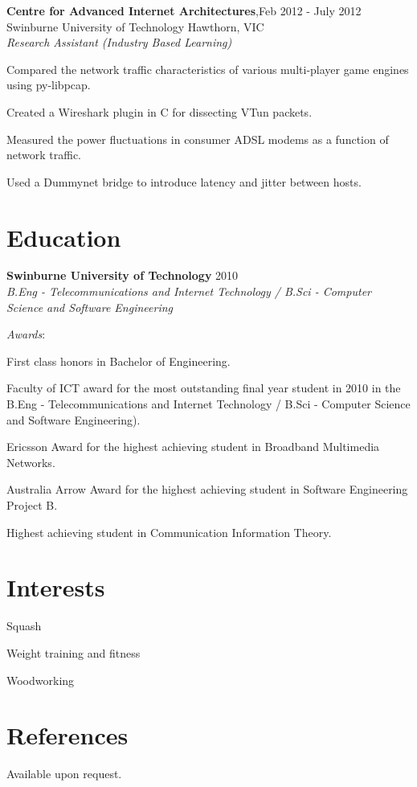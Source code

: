 \documentclass[line,margin]{res}
\begin{document}
\begin{resume}
        \textbf{Centre for Advanced Internet Architectures},\hfill Feb 2012 - July 2012 \\
        Swinburne University of Technology Hawthorn, VIC \\
        \textit{Research Assistant (Industry Based Learning)}\\
        
        \begin{list}{}{\leftmargin=1em \itemsep=-2pt}
            \item{Compared the network traffic characteristics of various multi-player game engines using
            py-libpcap.}
            \item{Created a Wireshark plugin in C for dissecting VTun packets.}
            \item{Measured the power fluctuations in consumer ADSL modems as a function of network traffic.}
            \item{Used a Dummynet bridge to introduce latency and jitter between hosts.}
        \end{list}

        \section{Education}
        \textbf{Swinburne University of Technology} \hfill 2010\\
        \textit{B.Eng - Telecommunications and Internet Technology / B.Sci - Computer Science and
        Software Engineering}

        \textit{Awards}:
        \begin{list}{}{\leftmargin=1em \itemsep=-2pt}
            \item{First class honors in Bachelor of Engineering.}
            \item{Faculty of ICT award for the most outstanding final year student in 2010 in the B.Eng -
            Telecommunications and Internet Technology / B.Sci - Computer Science and Software
            Engineering).}
            \item{Ericsson Award for the highest achieving student in Broadband Multimedia Networks.}
            \item{Australia Arrow Award for the highest achieving student in Software Engineering Project B.}
            \item{Highest achieving student in Communication Information Theory.}
        \end{list}

        \section{Interests}
        \begin{list}{}{\leftmargin=1em \itemsep=-2pt}
            \item{Squash}
            \item{Weight training and fitness}
            \item{Woodworking}
        \end{list}

        \section{References}
        Available upon request.
    \end{resume}
\end{document}
